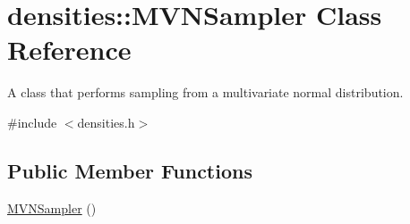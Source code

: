 \hypertarget{classdensities_1_1MVNSampler}{}\section{densities\+:\+:M\+V\+N\+Sampler Class Reference}
\label{classdensities_1_1MVNSampler}


A class that performs sampling from a multivariate normal distribution.  




{\ttfamily \#include $<$densities.\+h$>$}

\subsection*{Public Member Functions}
\begin{DoxyCompactItemize}
\item 
\hyperlink{classdensities_1_1MVNSampler_abb1cac251d106e802ac99d70ae8a08fe}{M\+V\+N\+Sampler} ()\hypertarget{classdensities_1_1MVNSampler_abb1cac251d106e802ac99d70ae8a08fe}{}\label{classdensities_1_1MVNSampler_abb1cac251d106e802ac99d70ae8a08fe}


\end{DoxyCompactItemize}
